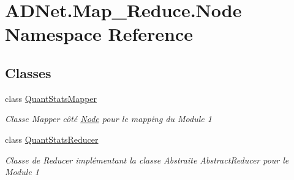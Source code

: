 \hypertarget{namespace_a_d_net_1_1_map___reduce_1_1_node}{}\section{A\+D\+Net.\+Map\+\_\+\+Reduce.\+Node Namespace Reference}
\label{namespace_a_d_net_1_1_map___reduce_1_1_node}
\subsection*{Classes}
\begin{DoxyCompactItemize}
\item 
class \hyperlink{class_a_d_net_1_1_map___reduce_1_1_node_1_1_quant_stats_mapper}{Quant\+Stats\+Mapper}
\begin{DoxyCompactList}\small\item\em Classe Mapper côté \hyperlink{namespace_a_d_net_1_1_map___reduce_1_1_node}{Node} pour le mapping du Module 1 \end{DoxyCompactList}\item 
class \hyperlink{class_a_d_net_1_1_map___reduce_1_1_node_1_1_quant_stats_reducer}{Quant\+Stats\+Reducer}
\begin{DoxyCompactList}\small\item\em Classe de Reducer implémentant la classe Abstraite Abstract\+Reducer pour le Module 1 \end{DoxyCompactList}\end{DoxyCompactItemize}
